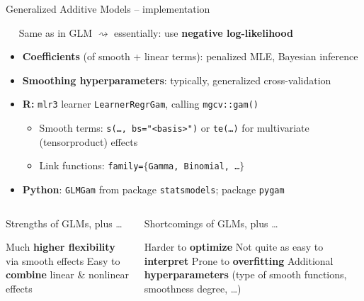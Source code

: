 
\begin{frame}{Generalized Additive Models -- implementation}

 ~~ Same as in GLM $\rightsquigarrow$ essentially:
use \textbf{negative log-likelihood}

\medskip

\begin{itemize}
  \item \textbf{Coefficients} (of smooth + linear terms):
  penalized MLE, Bayesian inference
  \item \textbf{Smoothing hyperparameters}: typically, generalized
  cross-validation
\end{itemize}

\medskip


\begin{itemize}
  \item \textbf{R:} \texttt{mlr3} learner \texttt{LearnerRegrGam},
    calling \texttt{mgcv::gam()}
  \begin{itemize}
      \item Smooth terms: \texttt{s(\dots, bs="<basis>")} or \texttt{te(\dots)}
      for multivariate (tensorproduct) effects
      \item Link functions: \texttt{family=$\{$Gamma, Binomial, \dots $\}$}
  \end{itemize}
    \item \textbf{Python}: \texttt{GLMGam} from package \texttt{statsmodels};
    package \texttt{pygam}
\end{itemize}

\medskip
\begin{columns}[onlytextwidth]
  \begin{column}{0.5\textwidth}

    Strengths of GLMs, plus \dots
    \begin{itemize}
      \positem Much \textbf{higher flexibility} via smooth effects
      \positem Easy to \textbf{combine} linear \& nonlinear effects
    \end{itemize}
  \end{column}

  \begin{column}{0.5\textwidth}

    Shortcomings of GLMs, plus \dots
    \begin{itemize}
      \negitem Harder to \textbf{optimize}
      \negitem Not quite as easy to \textbf{interpret}
      \negitem Prone to \textbf{overfitting}
      \negitem Additional \textbf{hyperparameters} (type of smooth functions,
      smoothness degree, \dots)
    \end{itemize}
  \end{column}
\end{columns}

\end{frame}
